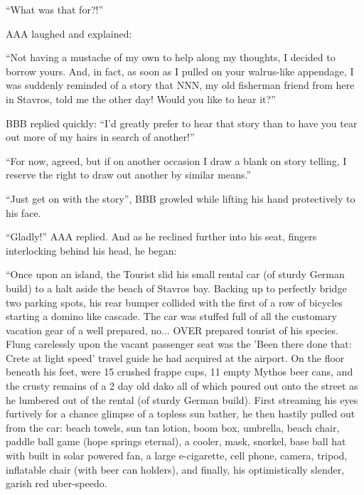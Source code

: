 \documentclass[10pt,twoside,openright]{memoir}
\begin{document}
``What was that for?!''

AAA laughed and explained:

``Not having a mustache of my own to help along my thoughts, I decided to borrow yours. And, in fact, as soon as I pulled on your walrus-like appendage, I was suddenly reminded of a story that NNN, my old fisherman friend from here in Stavros, told me the other day! Would you like to hear it?''

BBB replied quickly: ``I'd greatly prefer to hear that story than to have you tear out more of my hairs in search of another!''

``For now, agreed, but if on another occasion I draw a blank on story telling, I reserve the right to draw out another by similar means.''

``Just get on with the story'', BBB growled while lifting his hand protectively to his face.

``Gladly!'' AAA replied. And as he reclined further into his seat, fingers interlocking behind his head, he began:

``Once upon an island, the Tourist slid his small rental car (of sturdy German build) to a halt aside the beach of Stavros bay. Backing up to perfectly bridge two parking spots, his rear bumper collided with the first of a row of bicycles starting a domino like cascade. The car was stuffed full of all the customary vacation gear of a well prepared, no... OVER prepared tourist of his species. Flung carelessly upon the vacant passenger seat was the 'Been there done that: Crete at light speed' travel guide he had acquired at the airport. On the floor beneath his feet, were 15 crushed frappe cups, 11 empty Mythos beer cans, and the crusty remains of a 2 day old dako all of which poured out onto the street as he lumbered out of the rental (of sturdy German build). First streaming his eyes furtively for a chance glimpse of a topless sun bather, he then hastily pulled out from the car: beach towels, sun tan lotion, boom box, umbrella, beach chair, paddle ball game (hope springs eternal), a cooler, mask, snorkel, base ball hat with built in solar powered fan, a large e-cigarette, cell phone, camera, tripod, inflatable chair (with beer can holders), and finally, his optimistically slender, garish red uber-speedo.
\end{document}
